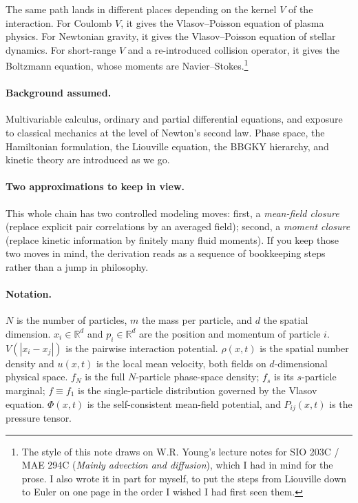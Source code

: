 \documentclass{article}
\begin{document}
The same path lands in different places depending on the kernel \(V\) of the interaction. For Coulomb \(V\), it gives the Vlasov--Poisson equation of plasma physics. For Newtonian gravity, it gives the Vlasov--Poisson equation of stellar dynamics. For short-range \(V\) and a re-introduced collision operator, it gives the Boltzmann equation, whose moments are Navier--Stokes.\footnote{The style of this note draws on W.R. Young's lecture notes for SIO 203C / MAE 294C (\emph{Mainly advection and diffusion}), which I had in mind for the prose. I also wrote it in part for myself, to put the steps from Liouville down to Euler on one page in the order I wished I had first seen them.}

\paragraph{Background assumed.} Multivariable calculus, ordinary and partial differential equations, and exposure to classical mechanics at the level of Newton's second law. Phase space, the Hamiltonian formulation, the Liouville equation, the BBGKY hierarchy, and kinetic theory are introduced as we go.

\paragraph{Two approximations to keep in view.} This whole chain has two controlled modeling moves: first, a \emph{mean-field closure} (replace explicit pair correlations by an averaged field); second, a \emph{moment closure} (replace kinetic information by finitely many fluid moments). If you keep those two moves in mind, the derivation reads as a sequence of bookkeeping steps rather than a jump in philosophy.

\paragraph{Notation.} \(N\) is the number of particles, \(m\) the mass per particle, and \(d\) the spatial dimension. \(x_i \in \mathbb{R}^d\) and \(p_i \in \mathbb{R}^d\) are the position and momentum of particle \(i\). \(V(|x_i - x_j|)\) is the pairwise interaction potential. \(\rho(x, t)\) is the spatial number density and \(u(x, t)\) is the local mean velocity, both fields on \(d\)-dimensional physical space. \(f_N\) is the full \(N\)-particle phase-space density; \(f_s\) is its \(s\)-particle marginal; \(f \equiv f_1\) is the single-particle distribution governed by the Vlasov equation. \(\Phi(x, t)\) is the self-consistent mean-field potential, and \(P_{ij}(x, t)\) is the pressure tensor.
\end{document}
